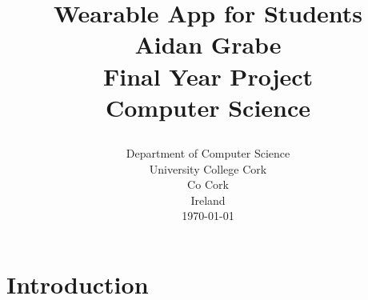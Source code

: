 \documentclass[12pt]{report}
\title{
    {\huge Wearable App for Students}\\
    {\textbf{Aidan Grabe}}\\
    {\vspace{12px}}
    {Final Year Project}\\
    {Computer Science}\\
    {\vspace{12px}}
    {\begin{figure}}
        \texttt{[image: ucc\_logo.jpg]}
    {\end{figure}}
}
\author {}
\date {
    {Department of Computer Science}\\
    {University College Cork}\\
    {Co Cork}\\
    {Ireland}\\
    {\today}
}
\begin{document}
\maketitle



\chapter{Introduction}

\end{document}
